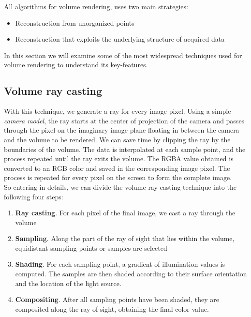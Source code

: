 All algorithms for volume rendering, uses two main strategies:
\begin{itemize}
 \item Reconstruction from unorganized points
 \item Reconstruction that exploits the underlying structure of acquired data
\end{itemize}

In this section we will examine some of the most widespread techniques used for volume rendering to understand its key-features.

\subsection{Volume ray casting}

With this technique, we generate a ray for every image pixel. Using a simple \textit{camera model}, the ray starts at the center of projection of the camera and passes through the pixel on the imaginary image plane floating in between the camera and the volume to be rendered. We can save time by clipping the ray by the boundaries of the volume. The data is interpolated at each sample point, and the process repeated until the ray exits the volume. The RGBA value obtained is converted to an RGB color and saved in the corresponding image pixel. The process is repeated for every pixel on the screen to form the complete image.\\

So entering in details, we can divide the volume ray casting technique into the following four steps:
\begin{enumerate}
\item \textbf{Ray casting}. For each pixel of the final image, we cast a ray through the volume
\item \textbf{Sampling}. Along the part of the ray of sight that lies within the volume, equidistant sampling points or samples are selected
\item \textbf{Shading}. For each sampling point, a gradient of illumination values is computed. The samples are then shaded according to their surface orientation and the location of the light source.
\item \textbf{Compositing}. After all sampling points have been shaded, they are composited along the ray of sight, obtaining the final color value.
\end{enumerate}

